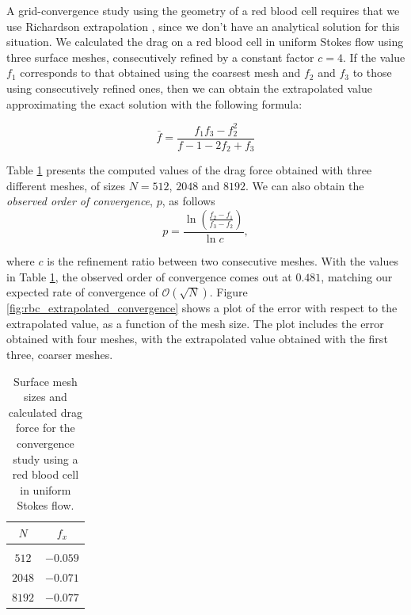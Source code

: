 \documentclass[final,leqno,]{siamltex1213}
\renewcommand{\O}[1]{\mathcal{O}(#1)}
\begin{document}
A grid-convergence study using the geometry of a red blood cell requires that we use Richardson extrapolation \cite{roache1998}, since we don't have an analytical solution for this situation. We calculated the drag on a red blood cell in uniform Stokes flow using three surface meshes, consecutively refined by a constant factor $c=4$. 
If the value $f_1$ corresponds to that obtained using the coarsest mesh and $f_2$ and $f_3$ to those using consecutively refined ones, then we can obtain the extrapolated value approximating the exact solution with the following formula:

\begin{equation}
	\bar{f} = \frac{f_1f_3-f_2^{2}}{f-1 -2f_2+f_3}
\end{equation}

Table \ref{tab:rbc_richardson_values} presents the computed values of the drag force obtained with three different meshes, of sizes $N=512$, $2048$ and $8192$. We can also obtain the \emph{observed order of convergence}, $p$, as follows
%
\begin{equation}
	p = \frac{\ln{\left(\frac{f_2-f_1}{f_3-f_2}\right)}}{\ln{c}},
\end{equation}

\noindent where $c$ is the refinement ratio between two consecutive meshes. With the values in Table \ref{tab:rbc_richardson_values}, the observed order of convergence comes out at $0.481$, matching our expected rate of convergence of $\O{\sqrt{N}}$. 
Figure \ref{fig:rbc_extrapolated_convergence} shows a plot of the error with respect to the extrapolated value, as a function of the mesh size. The plot includes the error obtained with four meshes, with the extrapolated value obtained with the first three, coarser meshes.

\begin{table}[h]
\footnotesize
\begin{center}
\begin{tabular}{c|c}
	$N$ & $f_x$ \\
	\hline
	& \\
	$512$ & $-0.059$ \\
	$2048$ & $-0.071$ \\ 
	$8192$ & $-0.077$ \\
\end{tabular}
\end{center}
\caption{Surface mesh sizes and calculated drag force for the convergence study using a red blood cell in uniform Stokes flow.}
\label{tab:rbc_richardson_values}
\end{table}%
\end{document}
